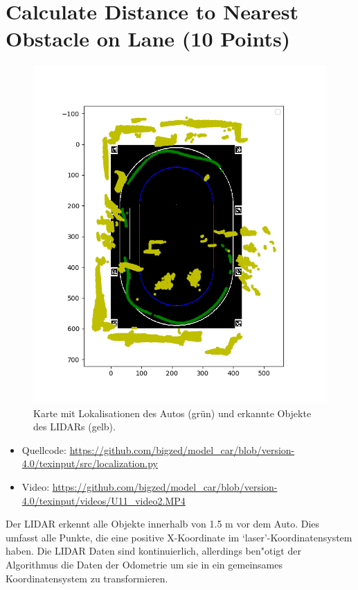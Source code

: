 \documentclass[10pt,oneside,a4paper]{article}
\begin{document}
  \section{Calculate Distance to Nearest Obstacle on Lane (10 Points)}
    \begin{figure}[h]
      \centering
      \includegraphics[scale=0.7]{pictures/circle_with_car_and_obstacles.png}
      \caption{Karte mit Lokalisationen des Autos (grün) und erkannte Objekte des LIDARs (gelb). }
    \end{figure}
    \begin{itemize}
      \item Quellcode: \url{https://github.com/bigzed/model_car/blob/version-4.0/texinput/src/localization.py}
      \item Video: \url{https://github.com/bigzed/model_car/blob/version-4.0/texinput/videos/U11_video2.MP4}
    \end{itemize}

	  Der LIDAR erkennt alle Objekte innerhalb von 1.5 m vor dem Auto. Dies umfasst alle Punkte,
    die eine positive X-Koordinate im `laser'-Koordinatensystem haben. Die
    LIDAR Daten sind kontinuierlich, allerdings ben"otigt der Algorithmus die Daten der Odometrie
    um sie in ein gemeinsames Koordinatensystem zu transformieren.
\end{document}
